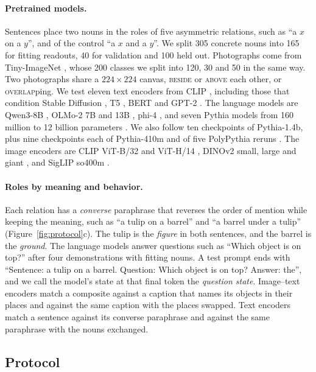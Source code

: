 \documentclass[10pt]{article}
\theoremstyle{plain}
\theoremstyle{remark}
\begin{document}
\paragraph{Pretrained models.} Sentences place two nouns in the roles of five asymmetric relations, such as ``a $x$ on a $y$'', and of the control ``a $x$ and a $y$''. We split 305 concrete nouns into 165 for fitting readouts, 40 for validation and 100 held out. Photographs come from Tiny-ImageNet \citep{le2015tiny}, whose 200 classes we split into 120, 30 and 50 in the same way. Two photographs share a $224 \times 224$ canvas, \textsc{beside} or \textsc{above} each other, or \textsc{overlap}ping. We test eleven text encoders from CLIP \citep{radford2021clip}, including those that condition Stable Diffusion \citep{rombach2022}, T5 \citep{raffel2020t5}, BERT \citep{devlin2019bert} and GPT-2 \citep{radford2019gpt2}. The language models are Qwen3-8B \citep{yang2025qwen3}, OLMo-2 7B and 13B \citep{olmo2024olmo2}, phi-4 \citep{abdin2024phi4}, and seven Pythia models from 160 million to 12 billion parameters \citep{biderman2023pythia}. We also follow ten checkpoints of Pythia-1.4b, plus nine checkpoints each of Pythia-410m and of five PolyPythia reruns \citep{vanderwal2025polypythias}. The image encoders are CLIP ViT-B/32 and ViT-H/14 \citep{radford2021clip,cherti2023}, DINOv2 small, large and giant \citep{oquab2024dinov2}, and SigLIP so400m \citep{zhai2023siglip}.

\paragraph{Roles by meaning and behavior.} Each relation has a \emph{converse} paraphrase that reverses the order of mention while keeping the meaning, such as ``a tulip on a barrel'' and ``a barrel under a tulip'' (Figure~\ref{fig:protocol}c). The tulip is the \emph{figure} in both sentences, and the barrel is the \emph{ground}. The language models answer questions such as ``Which object is on top?'' after four demonstrations with fitting nouns. A test prompt ends with ``Sentence: a tulip on a barrel. Question: Which object is on top? Answer: the'', and we call the model's state at that final token the \emph{question state}. Image--text encoders match a composite against a caption that names its objects in their places and against the same caption with the places swapped. Text encoders match a sentence against its converse paraphrase and against the same paraphrase with the nouns exchanged.

\subsection{Protocol}
\end{document}
